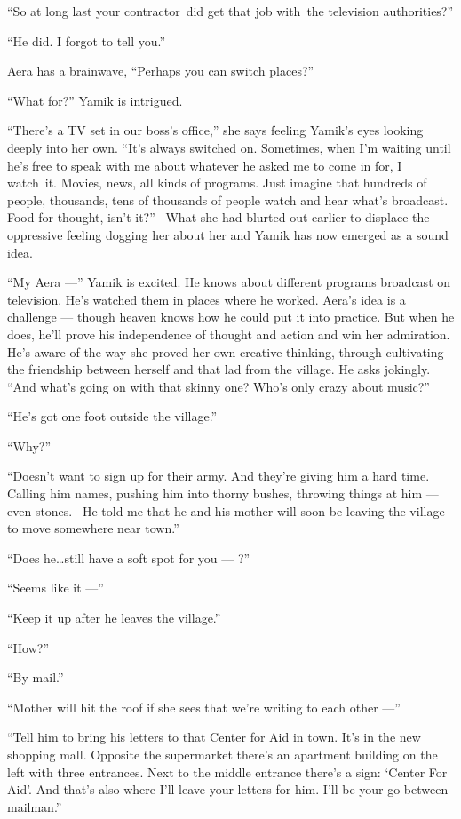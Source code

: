 \documentclass[twoside,11pt]{book}
\begin{document}
``So at long last your contractor~did get that job with~the television authorities?''

``He did. I forgot to tell you.''

Aera has a brainwave, ``Perhaps you can switch places?''

``What for?'' Yamik is intrigued.

``There's a TV set in our boss's office,'' she says feeling Yamik's eyes looking deeply into
her own.  ``It's always switched on. Sometimes, when I'm waiting until he's free to speak with me about
whatever he asked me to come in for, I watch~it. Movies, news, all kinds of programs. Just imagine that hundreds of
people, thousands, tens of thousands of people watch and hear what's broadcast. Food for thought, isn't
it?''~ What she had blurted out earlier to displace the oppressive feeling dogging her about her and Yamik
has now emerged as a sound idea.

``My Aera ---'' Yamik is excited. He knows about different programs broadcast on television.
He's watched them in places where he worked. Aera's idea is a challenge --- though heaven knows how he could put it into
practice. But when he does, he'll prove his independence of thought and action and win her admiration. He's aware of
the way she proved her own creative thinking, through cultivating the friendship between herself and
that lad from the village. He asks jokingly. ``And what's going on with that skinny one? Who's only crazy
about music?''

``He's got one foot outside the village.''

``Why?''

``Doesn't want to sign up for their army. And they're giving him a hard time. Calling him names, pushing
him into thorny bushes, throwing things at him --- even stones. ~He told me that he and his mother will soon be leaving
the village to move somewhere near town.''

``Does he{\ldots}still have a soft spot for you --- ?''

``Seems like it ---''

``Keep it up after he leaves the village.''

``How?''

``By mail.''

``Mother will hit the roof if she sees that we're writing to each other ---''

``Tell him to bring his letters to that Center for Aid in town. It's in the new shopping mall.  Opposite
the supermarket there's an apartment building on the left with three entrances. Next to the middle entrance there's a
sign: `Center For Aid'. And that's also where I'll leave your letters for him. I'll be your go-between
mailman.''
\end{document}

